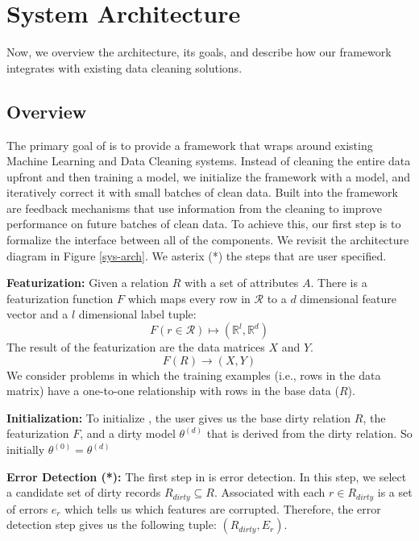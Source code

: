 \section{System Architecture}\label{arch}
Now, we overview the \sys architecture, its goals, and describe how our framework integrates with existing data cleaning solutions.

\subsection{Overview}
The primary goal of \sys is to provide a framework that wraps around existing Machine Learning and Data Cleaning systems.
Instead of cleaning the entire data upfront and then training a model, we initialize the framework with a model, and iteratively correct it with small batches of clean data.
Built into the framework are feedback mechanisms that use information from the cleaning to improve performance on future batches of clean data.
To achieve this, our first step is to formalize the interface between all of the components.
We revisit the architecture diagram in Figure \ref{sys-arch}.
We asterix (*) the steps that are user specified.

\vspace{0.5em}

\noindent \textbf{Featurization: } Given a relation $R$ with a set of attributes $A$.
There is a featurization function $F$ which maps every row in $\mathcal{R}$ to a $d$ dimensional feature vector and a $l$ dimensional label tuple: 
\[F(r \in \mathcal{R}) \mapsto (\mathbb{R}^l, \mathbb{R}^d)\]
The result of the featurization are the data matrices $X$ and $Y$.
\[
F(R)\rightarrow (X,Y)
\]
We consider problems in which the training examples (i.e., rows in the data matrix) have a one-to-one relationship with rows in the base data ($R$).

\vspace{0.5em}

\noindent\textbf{Initialization: } To initialize \sys, the user gives us the base dirty relation $R$, the featurization $F$, and a dirty model $\theta^{(d)}$ that is derived from the dirty relation. So initially $\theta^{(0)} = \theta^{(d)}$

\vspace{0.5em}

\noindent\textbf{Error Detection (*): } The first step in \sys is error detection. In this step, we select a candidate set of dirty records $R_{dirty} \subseteq R$.  
Associated with each $r \in R_{dirty}$ is a set of errors $e_r$ which tells us which features are corrupted.
Therefore, the error detection step gives us the following tuple: $(R_{dirty},E_r)$.

